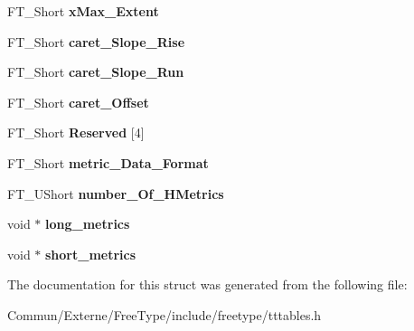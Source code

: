 \begin{DoxyCompactItemize}
\item 
F\+T\+\_\+\+Short {\bfseries x\+Max\+\_\+\+Extent}\hypertarget{struct_t_t___hori_header___ab483cb323f9adc9d959209a42eb19957}{}\label{struct_t_t___hori_header___ab483cb323f9adc9d959209a42eb19957}

\item 
F\+T\+\_\+\+Short {\bfseries caret\+\_\+\+Slope\+\_\+\+Rise}\hypertarget{struct_t_t___hori_header___aeb43d92f56de424d8f28bd389973eca4}{}\label{struct_t_t___hori_header___aeb43d92f56de424d8f28bd389973eca4}

\item 
F\+T\+\_\+\+Short {\bfseries caret\+\_\+\+Slope\+\_\+\+Run}\hypertarget{struct_t_t___hori_header___acce162ae0554006c11a3383bd3454d69}{}\label{struct_t_t___hori_header___acce162ae0554006c11a3383bd3454d69}

\item 
F\+T\+\_\+\+Short {\bfseries caret\+\_\+\+Offset}\hypertarget{struct_t_t___hori_header___a791ad767d54cc87e84d9b03d6739f0eb}{}\label{struct_t_t___hori_header___a791ad767d54cc87e84d9b03d6739f0eb}

\item 
F\+T\+\_\+\+Short {\bfseries Reserved} \mbox{[}4\mbox{]}\hypertarget{struct_t_t___hori_header___af2a2b374d8f81771fb75d3bdc96bcbf7}{}\label{struct_t_t___hori_header___af2a2b374d8f81771fb75d3bdc96bcbf7}

\item 
F\+T\+\_\+\+Short {\bfseries metric\+\_\+\+Data\+\_\+\+Format}\hypertarget{struct_t_t___hori_header___a0ed857e9629d2dfb5350a6b5976bf933}{}\label{struct_t_t___hori_header___a0ed857e9629d2dfb5350a6b5976bf933}

\item 
F\+T\+\_\+\+U\+Short {\bfseries number\+\_\+\+Of\+\_\+\+H\+Metrics}\hypertarget{struct_t_t___hori_header___aac3ecb9ba7c13436a663b91765e89647}{}\label{struct_t_t___hori_header___aac3ecb9ba7c13436a663b91765e89647}

\item 
void $\ast$ {\bfseries long\+\_\+metrics}\hypertarget{struct_t_t___hori_header___a3eeb5766b461e9563b659a30e775fcc2}{}\label{struct_t_t___hori_header___a3eeb5766b461e9563b659a30e775fcc2}

\item 
void $\ast$ {\bfseries short\+\_\+metrics}\hypertarget{struct_t_t___hori_header___ae39107c4cfc3e7c1871dbb304bbe4a5a}{}\label{struct_t_t___hori_header___ae39107c4cfc3e7c1871dbb304bbe4a5a}

\end{DoxyCompactItemize}


The documentation for this struct was generated from the following file\+:\begin{DoxyCompactItemize}
\item 
Commun/\+Externe/\+Free\+Type/include/freetype/tttables.\+h\end{DoxyCompactItemize}
